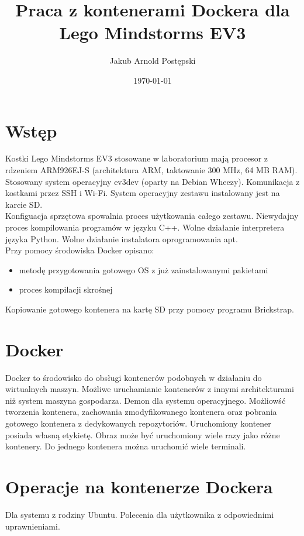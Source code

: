 \documentclass{article}
\begin{document}
\title{Praca z kontenerami Dockera dla Lego Mindstorms EV3\cite{lego}}   
\author{Jakub Arnold Postępski} 
\date{\today}

\maketitle

\section{Wstęp}
Kostki Lego Mindstorms EV3\cite{lego} stosowane w laboratorium mają procesor z rdzeniem ARM926EJ-S (architektura ARM, taktowanie 300 MHz, 64 MB RAM). Stosowany system operacyjny ev3dev (oparty na Debian Wheezy). Komunikacja z kostkami przez SSH i Wi-Fi. System operacyjny zestawu instalowany jest na karcie SD.\\
Konfiguacja sprzętowa spowalnia proces użytkowania całego zestawu. Niewydajny proces kompilowania programów w języku C++. Wolne działanie interpretera języka Python. Wolne działanie instalatora oprogramowania apt.\\
Przy pomocy środowiska Docker\cite{docker} opisano:
\begin{itemize}
\item metodę przygotowania gotowego OS z już zainstalowanymi pakietami
\item proces kompilacji skrośnej
\end{itemize}
Kopiowanie gotowego kontenera na kartę SD przy pomocy programu Brickstrap\cite{brickstrap}.
	
\section{Docker}
Docker\cite{docker} to środowisko do obsługi kontenerów podobnych w działaniu do wirtualnych maszyn. Możliwe uruchamianie kontenerów z innymi architekturami niż system maszyna gospodarza. Demon dla systemu operacyjnego. Możliowść tworzenia kontenera, zachowania zmodyfikowanego kontenera oraz pobrania gotowego kontenera z dedykowanych repozytoriów. Uruchomiony kontener posiada własną etykietę. Obraz może być uruchomiony wiele razy jako różne kontenery. Do jednego kontenera można uruchomić wiele terminali.

\section{Operacje na kontenerze Dockera}
Dla systemu z rodziny Ubuntu. Polecenia dla użytkownika z odpowiednimi uprawnieniami.\\
\end{document}

